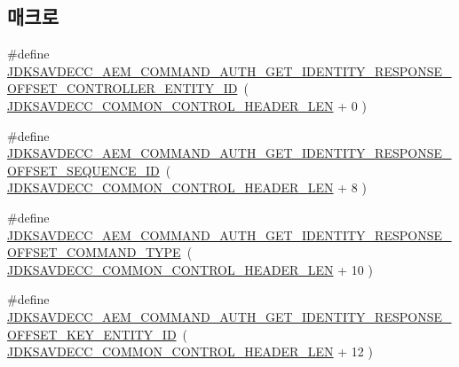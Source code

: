 \subsection*{매크로}
\begin{DoxyCompactItemize}
\item 
\#define \hyperlink{group__command__auth__get__identity__response_ga7b6e0ad16afd0f467bd713fe371b5f95}{J\+D\+K\+S\+A\+V\+D\+E\+C\+C\+\_\+\+A\+E\+M\+\_\+\+C\+O\+M\+M\+A\+N\+D\+\_\+\+A\+U\+T\+H\+\_\+\+G\+E\+T\+\_\+\+I\+D\+E\+N\+T\+I\+T\+Y\+\_\+\+R\+E\+S\+P\+O\+N\+S\+E\+\_\+\+O\+F\+F\+S\+E\+T\+\_\+\+C\+O\+N\+T\+R\+O\+L\+L\+E\+R\+\_\+\+E\+N\+T\+I\+T\+Y\+\_\+\+ID}~( \hyperlink{group__jdksavdecc__avtp__common__control__header_gaae84052886fb1bb42f3bc5f85b741dff}{J\+D\+K\+S\+A\+V\+D\+E\+C\+C\+\_\+\+C\+O\+M\+M\+O\+N\+\_\+\+C\+O\+N\+T\+R\+O\+L\+\_\+\+H\+E\+A\+D\+E\+R\+\_\+\+L\+EN} + 0 )
\item 
\#define \hyperlink{group__command__auth__get__identity__response_gad7814ce95b40a40d7ab7251616d417e9}{J\+D\+K\+S\+A\+V\+D\+E\+C\+C\+\_\+\+A\+E\+M\+\_\+\+C\+O\+M\+M\+A\+N\+D\+\_\+\+A\+U\+T\+H\+\_\+\+G\+E\+T\+\_\+\+I\+D\+E\+N\+T\+I\+T\+Y\+\_\+\+R\+E\+S\+P\+O\+N\+S\+E\+\_\+\+O\+F\+F\+S\+E\+T\+\_\+\+S\+E\+Q\+U\+E\+N\+C\+E\+\_\+\+ID}~( \hyperlink{group__jdksavdecc__avtp__common__control__header_gaae84052886fb1bb42f3bc5f85b741dff}{J\+D\+K\+S\+A\+V\+D\+E\+C\+C\+\_\+\+C\+O\+M\+M\+O\+N\+\_\+\+C\+O\+N\+T\+R\+O\+L\+\_\+\+H\+E\+A\+D\+E\+R\+\_\+\+L\+EN} + 8 )
\item 
\#define \hyperlink{group__command__auth__get__identity__response_gac61360ac616be563561cee37f88c4d2b}{J\+D\+K\+S\+A\+V\+D\+E\+C\+C\+\_\+\+A\+E\+M\+\_\+\+C\+O\+M\+M\+A\+N\+D\+\_\+\+A\+U\+T\+H\+\_\+\+G\+E\+T\+\_\+\+I\+D\+E\+N\+T\+I\+T\+Y\+\_\+\+R\+E\+S\+P\+O\+N\+S\+E\+\_\+\+O\+F\+F\+S\+E\+T\+\_\+\+C\+O\+M\+M\+A\+N\+D\+\_\+\+T\+Y\+PE}~( \hyperlink{group__jdksavdecc__avtp__common__control__header_gaae84052886fb1bb42f3bc5f85b741dff}{J\+D\+K\+S\+A\+V\+D\+E\+C\+C\+\_\+\+C\+O\+M\+M\+O\+N\+\_\+\+C\+O\+N\+T\+R\+O\+L\+\_\+\+H\+E\+A\+D\+E\+R\+\_\+\+L\+EN} + 10 )
\item 
\#define \hyperlink{group__command__auth__get__identity__response_ga3459b0136369bb606f78bb80f4556c2d}{J\+D\+K\+S\+A\+V\+D\+E\+C\+C\+\_\+\+A\+E\+M\+\_\+\+C\+O\+M\+M\+A\+N\+D\+\_\+\+A\+U\+T\+H\+\_\+\+G\+E\+T\+\_\+\+I\+D\+E\+N\+T\+I\+T\+Y\+\_\+\+R\+E\+S\+P\+O\+N\+S\+E\+\_\+\+O\+F\+F\+S\+E\+T\+\_\+\+K\+E\+Y\+\_\+\+E\+N\+T\+I\+T\+Y\+\_\+\+ID}~( \hyperlink{group__jdksavdecc__avtp__common__control__header_gaae84052886fb1bb42f3bc5f85b741dff}{J\+D\+K\+S\+A\+V\+D\+E\+C\+C\+\_\+\+C\+O\+M\+M\+O\+N\+\_\+\+C\+O\+N\+T\+R\+O\+L\+\_\+\+H\+E\+A\+D\+E\+R\+\_\+\+L\+EN} + 12 )

\end{DoxyCompactItemize}
